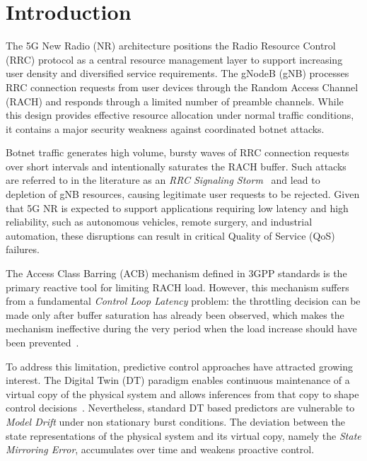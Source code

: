 \documentclass[conference]{IEEEtran}
\begin{document}
\section{Introduction}

The 5G New Radio (NR) architecture positions the Radio Resource Control (RRC) protocol as a central resource management layer to support increasing user density and diversified service requirements. The gNodeB (gNB) processes RRC connection requests from user devices through the Random Access Channel (RACH) and responds through a limited number of preamble channels. While this design provides effective resource allocation under normal traffic conditions, it contains a major security weakness against coordinated botnet attacks.

Botnet traffic generates high volume, bursty waves of RRC connection requests over short intervals and intentionally saturates the RACH buffer. Such attacks are referred to in the literature as an \emph{RRC Signaling Storm}~\cite{b1} and lead to depletion of gNB resources, causing legitimate user requests to be rejected. Given that 5G NR is expected to support applications requiring low latency and high reliability, such as autonomous vehicles, remote surgery, and industrial automation, these disruptions can result in critical Quality of Service (QoS) failures.

The Access Class Barring (ACB) mechanism defined in 3GPP standards is the primary reactive tool for limiting RACH load. However, this mechanism suffers from a fundamental \emph{Control Loop Latency} problem: the throttling decision can be made only after buffer saturation has already been observed, which makes the mechanism ineffective during the very period when the load increase should have been prevented~\cite{b2}.

To address this limitation, predictive control approaches have attracted growing interest. The Digital Twin (DT) paradigm enables continuous maintenance of a virtual copy of the physical system and allows inferences from that copy to shape control decisions~\cite{b3}. Nevertheless, standard DT based predictors are vulnerable to \emph{Model Drift} under non stationary burst conditions. The deviation between the state representations of the physical system and its virtual copy, namely the \emph{State Mirroring Error}, accumulates over time and weakens proactive control.
\end{document}
